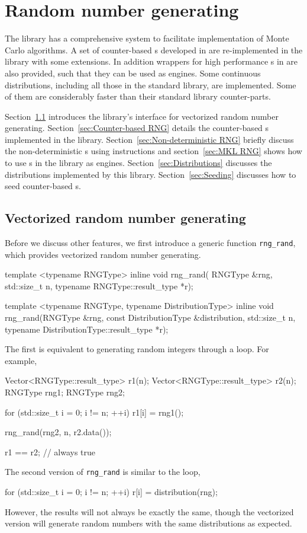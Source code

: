 \chapter{Random number generating}
\label{chap:Random number generating}

The library has a comprehensive \rng system to facilitate implementation of
Monte Carlo algorithms. A set of counter-based \rng{}s developed in
\textcite{Salmon:2011um} are re-implemented in the library with some
extensions. In addition wrappers for high performance \rng{}s in \mkl are also
provided, such that they can be used as \cppoo \rng engines. Some continuous
distributions, including all those in the standard library, are implemented.
Some of them are considerably faster than their standard library counter-parts.

Section~\ref{sec:Vectorized random number generating} introduces the library's
interface for vectorized random number generating.
Section~\ref{sec:Counter-based RNG} details the counter-based \rng{}s
implemented in the library. Section~\ref{sec:Non-deterministic RNG} briefly
discuss the non-deterministic \rng{}s using \rdrand instructions and
section~\ref{sec:MKL RNG} shows how to use \rng{}s in the \mkl library as
\cppoo engines. Section~\ref{sec:Distributions} discusses the distributions
implemented by this library. Section~\ref{sec:Seeding} discusses how to seed
counter-based \rng{}s.

\section{Vectorized random number generating}
\label{sec:Vectorized random number generating}

Before we discuss other features, we first introduce a generic function
\verb|rng_rand|, which provides vectorized random number generating.
\begin{cppcode}
  template <typename RNGType>
  inline void rng_rand(
      RNGType &rng, std::size_t n, typename RNGType::result_type *r);

  template <typename RNGType, typename DistributionType>
  inline void rng_rand(RNGType &rng, const DistributionType &distribution,
      std::size_t n, typename DistributionType::result_type *r);
\end{cppcode}
The first is equivalent to generating random integers through a loop. For
example,
\begin{cppcode}
  Vector<RNGType::result_type> r1(n);
  Vector<RNGType::result_type> r2(n);
  RNGType rng1;
  RNGType rng2;

  for (std::size_t i = 0; i != n; ++i)
      r1[i] = rng1();

  rng_rand(rng2, n, r2.data());

  r1 == r2; // always true
\end{cppcode}
The second version of \verb|rng_rand| is similar to the loop,
\begin{cppcode}
  for (std::size_t i = 0; i != n; ++i)
      r[i] = distribution(rng);
\end{cppcode}
However, the results will not always be exactly the same, though the vectorized
version will generate random numbers with the same distributions as expected.

